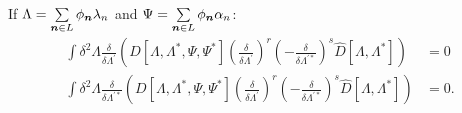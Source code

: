 \begin{lemma}
\label{lmm:formalism:func-wigner:zero-integrals}
If $\Lambda = \sum\limits_{\boldsymbol{n} \in L} \phi_{\boldsymbol{n}} \lambda_n$ and $\Psi = \sum\limits_{\boldsymbol{n} \in L} \phi_{\boldsymbol{n}} \alpha_n$:
\begin{equation*}
\begin{split}
	\int \delta^2\Lambda
		\frac{\delta}{\delta \Lambda^\prime} \left(
			D[\Lambda, \Lambda^*, \Psi, \Psi^*]
			\left( \frac{\delta}{\delta \Lambda^\prime} \right)^r
			\left( -\frac{\delta}{\delta \Lambda^{\prime*}} \right)^s
			\hat{D}[\Lambda, \Lambda^*]
		\right)
	& = 0 \\
	\int \delta^2\Lambda
		\frac{\delta}{\delta \Lambda^{\prime*}}
		\left(
			D[\Lambda, \Lambda^*, \Psi, \Psi^*]
			\left( \frac{\delta}{\delta \Lambda^\prime} \right)^r
			\left( -\frac{\delta}{\delta \Lambda^{\prime*}} \right)^s
			\hat{D}[\Lambda, \Lambda^*]
		\right)
	& = 0.
\end{split}
\end{equation*}
\end{lemma}
